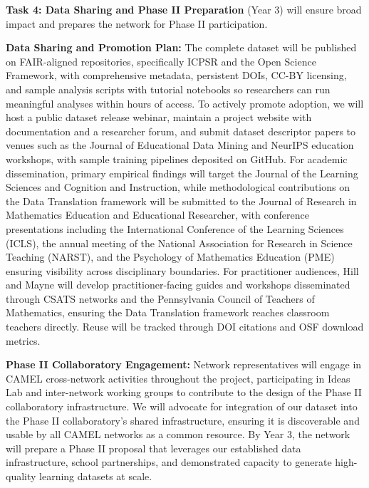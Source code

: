 \documentclass[11pt]{article}
\begin{document}
\vspace{-0.2cm}
\begin{tcolorbox}[colback=mycmykcolor, colframe=black, boxrule=1pt, coltext=black]
\vspace{-0.2cm}
\textbf{Task 4: Data Sharing and Phase II Preparation}
(Year 3) will ensure broad impact and prepares the network for Phase II participation.
\vspace{-0.2cm}
\end{tcolorbox}
\vspace{-0.1cm}

\textbf{Data Sharing and Promotion Plan:}
The complete dataset will be published on FAIR-aligned repositories, specifically ICPSR and the Open Science Framework, with comprehensive metadata, persistent DOIs, CC-BY licensing, and sample analysis scripts with tutorial notebooks so researchers can run meaningful analyses within hours of access. To actively promote adoption, we will host a public dataset release webinar, maintain a project website with documentation and a researcher forum, and submit dataset descriptor papers to venues such as the Journal of Educational Data Mining and NeurIPS education workshops, with sample training pipelines deposited on GitHub. For academic dissemination, primary empirical findings will target the Journal of the Learning Sciences and Cognition and Instruction, while methodological contributions on the Data Translation framework will be submitted to the Journal of Research in Mathematics Education and Educational Researcher, with conference presentations including the International Conference of the Learning Sciences (ICLS), the annual meeting of the National Association for Research in Science Teaching (NARST), and the Psychology of Mathematics Education (PME) ensuring visibility across disciplinary boundaries. For practitioner audiences, Hill and Mayne will develop practitioner-facing guides and workshops disseminated through CSATS networks and the Pennsylvania Council of Teachers of Mathematics, ensuring the Data Translation framework reaches classroom teachers directly. Reuse will be tracked through DOI citations and OSF download metrics.

\textbf{Phase II Collaboratory Engagement:}
Network representatives will engage in CAMEL cross-network activities throughout the project, participating in Ideas Lab and inter-network working groups to contribute to the design of the Phase II collaboratory infrastructure.
We will advocate for integration of our dataset into the Phase II collaboratory's shared infrastructure, ensuring it is discoverable and usable by all CAMEL networks as a common resource.
By Year 3, the network will prepare a Phase II proposal that leverages our established data infrastructure, school partnerships, and demonstrated capacity to generate high-quality learning datasets at scale.
\end{document}
